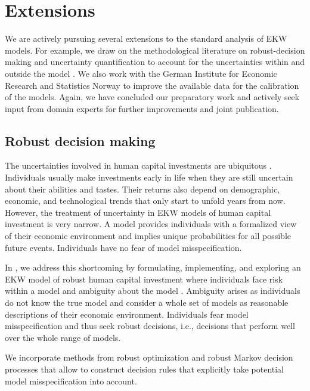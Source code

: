 \section{Extensions}\label{Extensions}
We are actively pursuing several extensions to the standard analysis of EKW models. For example, we draw on the methodological literature on robust-decision making and uncertainty quantification to account for the uncertainties within and outside the model \citep{Hansen.2015}. We also work with the German Institute for Economic Research and Statistics Norway to improve the available data for the calibration of the models. Again, we have concluded our preparatory work and actively seek input from domain experts for further improvements and joint publication.
\subsection{Robust decision making}
The uncertainties involved in human capital investments are ubiquitous \citep{Becker.1964}. Individuals usually make investments early in life when they are still uncertain about their abilities and tastes. Their returns also depend on demographic, economic, and technological trends that only start to unfold years from now. However, the treatment of uncertainty in EKW models of human capital investment is very narrow. A model provides individuals with a formalized view of their economic environment and implies unique probabilities for all possible future events. Individuals have no fear of model misspecification.

In \citet{Eisenhauer.2020}, we address this shortcoming by formulating, implementing, and exploring an EKW model of robust human capital investment where individuals face risk within a model and ambiguity about the model \citep{Arrow.1951}. Ambiguity arises as individuals do not know the true model and consider a whole set of models as reasonable descriptions of their economic environment. Individuals fear model misspecification and thus seek robust decisions, i.e., decisions that perform well over the whole range of models.

We incorporate methods from robust optimization \citep{Ben-Tal.2009, Rahimian.2019, Wiesemann.2014} and robust Markov decision processes \citep{Iyengar.2005, Nilim.2005} that allow to construct decision rules that explicitly take potential model misspecification into account.
